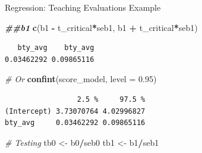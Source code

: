 \documentclass[
  ignorenonframetext,
]{beamer}
\newenvironment{Shaded}{\begin{snugshade}}{\end{snugshade}}
\newcommand{\AttributeTok}[1]{\textcolor[rgb]{0.13,0.29,0.53}{#1}}
\newcommand{\CommentTok}[1]{\textcolor[rgb]{0.56,0.35,0.01}{\textit{#1}}}
\newcommand{\DocumentationTok}[1]{\textcolor[rgb]{0.56,0.35,0.01}{\textbf{\textit{#1}}}}
\newcommand{\FloatTok}[1]{\textcolor[rgb]{0.00,0.00,0.81}{#1}}
\newcommand{\FunctionTok}[1]{\textcolor[rgb]{0.13,0.29,0.53}{\textbf{#1}}}
\newcommand{\NormalTok}[1]{#1}
\newcommand{\OtherTok}[1]{\textcolor[rgb]{0.56,0.35,0.01}{#1}}
\newcommand{\SpecialCharTok}[1]{\textcolor[rgb]{0.81,0.36,0.00}{\textbf{#1}}}
\begin{document}
\begin{frame}[fragile]{Regression: Teaching Evaluations Example}
\label{regression-teaching-evaluations-example-12}
\normalsize

\begin{Shaded}
\begin{Highlighting}[]
\DocumentationTok{\#\#b1}
\FunctionTok{c}\NormalTok{(b1 }\SpecialCharTok{{-}}\NormalTok{ t\_critical}\SpecialCharTok{*}\NormalTok{seb1, b1 }\SpecialCharTok{+}\NormalTok{ t\_critical}\SpecialCharTok{*}\NormalTok{seb1)}
\end{Highlighting}
\end{Shaded}

\begin{verbatim}
   bty_avg    bty_avg 
0.03462292 0.09865116 
\end{verbatim}

\begin{Shaded}
\begin{Highlighting}[]
\CommentTok{\# Or}
\FunctionTok{confint}\NormalTok{(score\_model, }\AttributeTok{level =} \FloatTok{0.95}\NormalTok{)}
\end{Highlighting}
\end{Shaded}

\begin{verbatim}
                 2.5 %     97.5 %
(Intercept) 3.73070764 4.02996827
bty_avg     0.03462292 0.09865116
\end{verbatim}

\begin{Shaded}
\begin{Highlighting}[]
\CommentTok{\# Testing}
\NormalTok{tb0 }\OtherTok{\textless{}{-}}\NormalTok{ b0}\SpecialCharTok{/}\NormalTok{seb0}
\NormalTok{tb1 }\OtherTok{\textless{}{-}}\NormalTok{ b1}\SpecialCharTok{/}\NormalTok{seb1}
\end{Highlighting}
\end{Shaded}

\normalsize
\end{frame}
\end{document}

